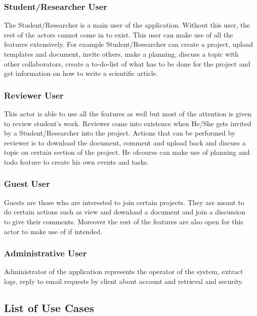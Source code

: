 \subsubsection{Student/Researcher User} 
The Student/Researcher is a main user of the application. Without this user, the rest of the actors cannot come in to exist. This user can make use of all the features extensively. For example Student/Researcher can create a project, upload templates and document, invite others, make a planning, discuss a topic with other collaborators, create a to-do-list of what has to be done for the project and get information on how to write a scientific article.

\subsubsection{Reviewer User} 
This actor is able to use all the features as well but most of the attention is given to review student's work. Reviewer come into existence when He/She gets invited by a Student/Researcher into the project. Actions that can be performed by reviewer is to download the document, comment and upload back and discuss a topic on certain  section of the project. He ofcourse can make use of planning and todo feature to create his own events and tasks.

\subsubsection{Guest User} 
Guests are those who are interested to join certain projects. They are meant to do certain actions such as view and download a document and join a discussion to give their comments. Moreover the rest of the features are also open for this actor to make use of if intended.

\subsubsection{Administrative User} 
Administrator of the application represents the operator of the system, extract logs, reply to email requests by client about account and retrieval and security.

\subsection{List of Use Cases} %
\label{sub:list_of_use_cases}
